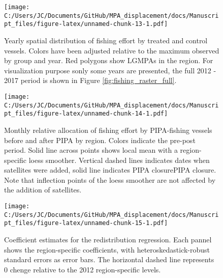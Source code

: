 \documentclass[11pt,]{article}
\begin{document}
\begin{figure}
\centering
\texttt{[image: C:/Users/JC/Documents/GitHub/MPA\_displacement/docs/Manuscript\_files/figure-latex/unnamed-chunk-13-1.pdf]}
\caption{\label{fig:unnamed-chunk-13}\label{fig:fishing_raster}Yearly
spatial distribution of fishing effort by treated and control vessels.
Colors have been adjusted relative to the maximum observed by group and
year. Red polygons show LGMPAs in the region. For visualization purpose
sonly some years are presented, the full 2012 - 2017 period is shown in
Figure \ref{fig:fishing_raster_full}.}
\end{figure}

\begin{figure}
\centering
\texttt{[image: C:/Users/JC/Documents/GitHub/MPA\_displacement/docs/Manuscript\_files/figure-latex/unnamed-chunk-14-1.pdf]}
\caption{\label{fig:unnamed-chunk-14}\label{fig:redist_trend}Monthly
relative allocation of fishing effort by PIPA-fishing vessels before and
after PIPA by region. Colors indicate the pre-post period. Solid line
across points shows local mean with a region-specific loess smoother.
Vertical dashed lines indicates dates when satellites were added, solid
line indicates PIPA closurePIPA closure. Note that inflection points of
the loess smoother are not affected by the addition of satellites.}
\end{figure}

\begin{figure}
\centering
\texttt{[image: C:/Users/JC/Documents/GitHub/MPA\_displacement/docs/Manuscript\_files/figure-latex/unnamed-chunk-15-1.pdf]}
\caption{\label{fig:unnamed-chunk-15}\label{fig:mean_change}Coefficient
estimates for the redistribution regression. Each pannel shows the
region-specific coefficients, with heteroskedastick-robust standard
errors as error bars. The horizontal dashed line represents 0 chenge
relative to the 2012 region-specific levels.}
\end{figure}
\end{document}
